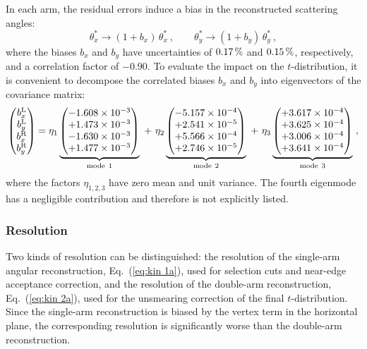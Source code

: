 In each arm, the residual errors induce a bias in the reconstructed scattering angles:
\begin{equation}
\label{eq:opt bias}
	\theta_x^* \rightarrow (1 + b_x)\, \theta_x^*\ ,\qquad
	\theta_y^* \rightarrow (1 + b_y)\, \theta_y^*\ ,
\end{equation}
where the biases $b_x$ and $b_y$ have uncertainties of $0.17\,{\rm \%}$ and $0.15\,{\rm \%}$, respectively, and a correlation factor of $-0.90$. To evaluate the impact on the $t$-distribution, it is convenient to decompose the correlated biases $b_x$ and $b_y$ into eigenvectors of the covariance matrix:
\begin{equation}
\label{eq:opt bias modes}
\begin{pmatrix} b_x^{\rm L}\cr b_y^{\rm L} \cr b_x^{\rm R}\cr b_y^{\rm R} \end{pmatrix} =
	   \eta_1 \underbrace{\begin{pmatrix} -1.608\times10^{-3}\cr +1.473\times10^{-3}\cr -1.630\times10^{-3}\cr +1.477\times10^{-3} \end{pmatrix}}_{\rm mode\ 1}
  \ +\ \eta_2 \underbrace{\begin{pmatrix} -5.157\times10^{-4}\cr +2.541\times10^{-5}\cr +5.566\times10^{-4}\cr +2.746\times10^{-5} \end{pmatrix}}_{\rm mode\ 2}
  \ +\ \eta_3 \underbrace{\begin{pmatrix} +3.617\times10^{-4}\cr +3.625\times10^{-4}\cr +3.006\times10^{-4}\cr +3.641\times10^{-4} \end{pmatrix}}_{\rm mode\ 3}\ ,
\end{equation}
where the factors $\eta_{1,2,3}$ have zero mean and unit variance. The fourth eigenmode has a negligible contribution and therefore is not explicitly listed.




\subsubsection{Resolution}
\label{sec:resolution}

Two kinds of resolution can be distinguished: the resolution of the single-arm angular reconstruction, Eq.~(\ref{eq:kin 1a}), used for selection cuts and near-edge acceptance correction, and the resolution of the double-arm reconstruction, Eq.~(\ref{eq:kin 2a}), used for the unsmearing correction of the final $t$-distribution. Since the single-arm reconstruction is biased by the vertex term in the horizontal plane, the corresponding resolution is significantly worse than the double-arm reconstruction.

